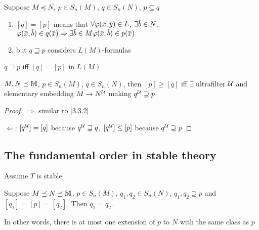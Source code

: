 \documentclass[11pt]{article}
\begin{document}
\begin{remark}
Suppose \(M\preceq N\), \(p\in S_n(M)\), \(q\in S_n(N)\), \(p\subseteq q\)
\begin{enumerate}
\item \([q]=[p]\)  means
that
\(\forall\varphi(\barx,\bary)\in L\),
\(\exists\barb\in N\), \(\varphi(\barx,\barb)\in q(\barx)\Rightarrow \exists\barb\in M\varphi(\barx,\barb)\in p(\barx)\)
\item but \(q\sqsupseteq p\) considers \(L(M)\)-formulas
\end{enumerate}


\(q\sqsupseteq p\) iff \([q]=[p]\) in \(L(M)\)
\end{remark}

\begin{proposition}[]
\label{3.31.7}
\(M,N\preceq\mathbb{M}\), \(p\in S_n(M)\), \(q\in S_n(N)\), then \([p]\ge[q]\) iff \(\exists\) ultrafilter \(\mathcal{U}\) and
elementary embedding \(M\to N^{\mathcal{U}}\) making \(q^{\mathcal{U}}\supseteq p\)
\end{proposition}

\begin{proof}
\(\Rightarrow\) similar to \ref{3.3.2}

\(\Leftarrow\): \([q^{\mathcal{U}}]=[q]\) because \(q^{\mathcal{U}}\sqsupseteq q\), \([q^{\mathcal{U}}]\le[p]\) because \(q^{\mathcal{U}}\supseteq p\)
\end{proof}
\subsection{The fundamental order in stable theory}
\label{sec:orge675fdd}
Assume \(T\) is stable
\begin{lemma}[]
\label{3.31.8}
Suppose \(M\preceq N\preceq\mathbb{M}\), \(p\in S_n(M)\), \(q_1,q_2\in S_n(N)\), \(q_1,q_2\supseteq p\) and \([q_1]=[p]=[q_2]\).
Then \(q_1=q_2\).

In other words, there is at most one extension of \(p\) to \(N\) with the same class as \(p\)
\end{lemma}
\end{document}
